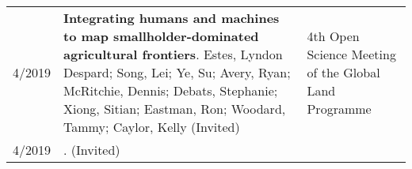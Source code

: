 \begin{longtable}{lp{10.0cm}p{4.5cm}}
4/2019 & {\bf Integrating humans and machines to map smallholder-dominated agricultural frontiers}. Estes, Lyndon Despard; Song, Lei; Ye, Su; Avery, Ryan; McRitchie, Dennis; Debats, Stephanie; Xiong, Sitian; Eastman, Ron; Woodard, Tammy; Caylor, Kelly  (Invited)  & 4th Open Science Meeting of the Global Land Programme \\
  
4/2019 & {\bf }.   (Invited)  &  \\
 \end{longtable}

